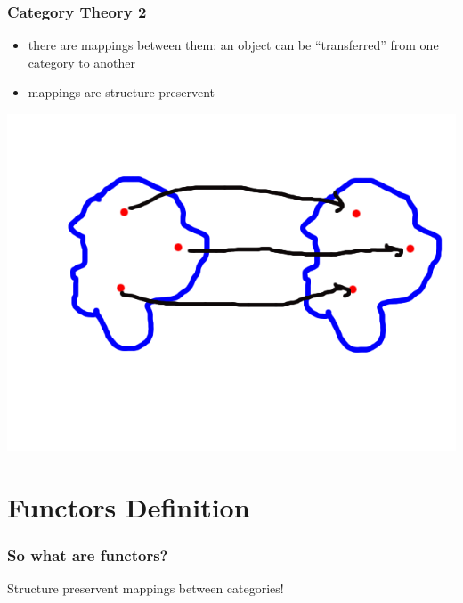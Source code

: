 \documentclass[12pt, xcolor=table]{beamer}
\begin{document}
\begin{frame}
    \frametitle{Category Theory 2}
    \begin{itemize}
        \item there are mappings between them: an object can be ``transferred'' from one category to another
        \item  mappings are structure preservent
    \end{itemize}
    \begin{center}
        \includegraphics[scale=0.3]{figures/structurePreserv.png}
    \end{center}
\end{frame}

\section{Functors Definition}
\begin{frame}
    \frametitle{So what are functors?}
    Structure preservent mappings between categories!
\end{frame}
\end{document}
